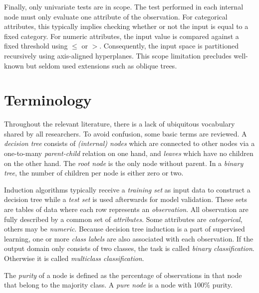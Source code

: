 Finally, only univariate tests are in scope. The test performed in each internal node must only evaluate one attribute of the observation. For categorical attributes, this typically implies checking whether or not the input is equal to a fixed category. For numeric attributes, the input value is compared against a fixed threshold using $\leq$ or $>$. Consequently, the input space is partitioned recursively using axis-aligned hyperplanes. This scope limitation precludes well-known but seldom used extensions such as oblique trees.

\section{Terminology}
Throughout the relevant literature, there is a lack of ubiquitous vocabulary shared by all researchers. To avoid confusion, some basic terms are reviewed. A \emph{decision tree} consists of \emph{(internal) nodes} which are connected to other nodes via a one-to-many \emph{parent-child} relation on one hand, and \emph{leaves} which have no children on the other hand. The \emph{root node} is the only node without parent. In a \emph{binary tree}, the number of children per node is either zero or two.

Induction algorithms typically receive a \emph{training set} as input data to construct a decision tree while a \emph{test set} is used afterwards for model validation. These sets are tables of data where each row represents an \emph{observation}. All observation are fully described by a common set of \emph{attributes}. Some attributes are \emph{categorical}, others may be \emph{numeric}. Because decision tree induction is a part of supervised learning, one or more \emph{class labels} are also associated with each observation. If the output domain only consists of two classes, the task is called \emph{binary classification}. Otherwise it is called \emph{multiclass classification}.

The \emph{purity} of a node is defined as the percentage of observations in that node that belong to the majority class. A \emph{pure node} is a node with 100\% purity.


